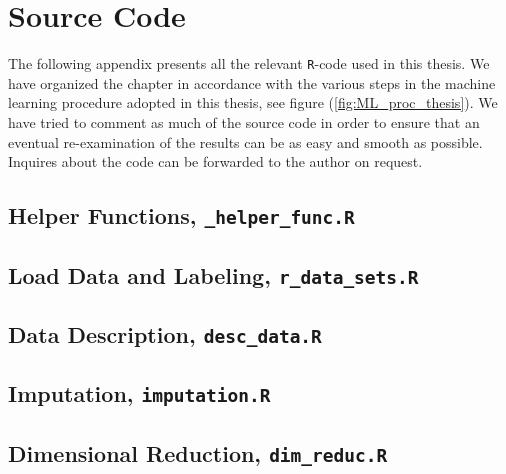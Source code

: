 \documentclass[../thesis.tex]{subfiles}
\begin{document}
\chapter{Source Code}
\label{chap:souce_code}

\noindent The following appendix presents all the relevant \texttt{R}-code used in this thesis. We have organized the chapter in accordance with the various steps in the machine learning procedure adopted in this thesis, see figure (\ref{fig:ML_proc_thesis}). We have tried to comment as much of the source code in order to ensure that an eventual re-examination of the results can be as easy and smooth as possible. Inquires about the code can be forwarded to the author on request.

\section{Helper Functions, \texttt{\_helper\_func.R}}
\label{sec:helper_func}



\section{Load Data and Labeling, \texttt{r\_data\_sets.R}}
\label{sec:load_data}



\section{Data Description, \texttt{desc\_data.R}}
\label{sec:app_desc_stat}



\section{Imputation, \texttt{imputation.R}}
\label{sec:app_impu}



\section{Dimensional Reduction, \texttt{dim\_reduc.R}}
\label{sec:dim_red}
\end{document}
